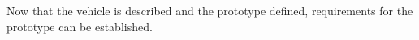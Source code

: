 Now that the vehicle is described and the prototype defined, requirements for the prototype can be established.


%
%
%
%

